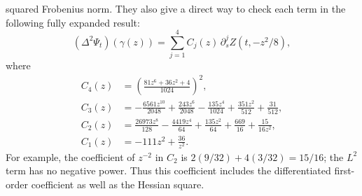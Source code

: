 squared Frobenius norm. They also give a direct way to check each term
in the following fully expanded result:
\begin{equation}
 (\Delta^2\Psi_t)(\gamma(z))
 =\sum_{j=1}^4 C_j(z)\,\partial_s^jZ(t,-z^2/8),\label{ab:full}
\end{equation}
where
\begin{align*}
 C_4(z)&=\left(\frac{81z^6+36z^2+4}{1024}\right)^2,\\
 C_3(z)&=-\frac{6561z^{10}}{2048}+\frac{243z^6}{2048}
           -\frac{135z^4}{1024}+\frac{351z^2}{512}+\frac{31}{512},\\
 C_2(z)&=\frac{26973z^8}{128}-\frac{4419z^4}{64}
           +\frac{135z^2}{64}+\frac{669}{16}+\frac{15}{16z^2},\\
 C_1(z)&=-111z^2+\frac{36}{z^2}.
\end{align*}
For example, the coefficient of $z^{-2}$ in $C_2$ is
$2(9/32)+4(3/32)=15/16$; the $L^2$ term has no negative
power. Thus this coefficient includes the differentiated first-order
coefficient as well as the Hessian square.

